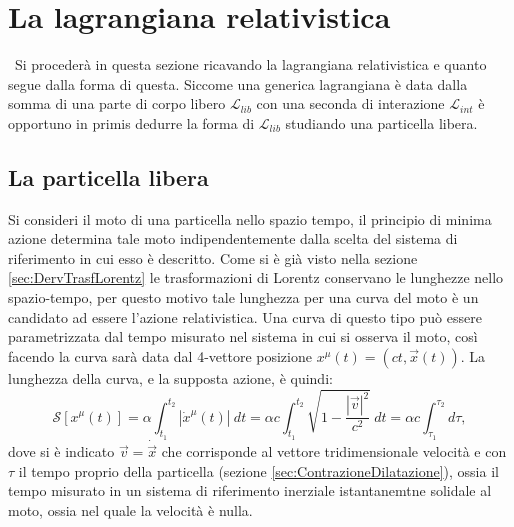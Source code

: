 \section{La lagrangiana relativistica}\
Si procederà in questa sezione ricavando la lagrangiana relativistica e quanto segue dalla forma di questa. Siccome una generica lagrangiana è data dalla somma di una parte di corpo libero $\mathcal{L}_{lib}$ con una seconda di interazione $\mathcal{L}_{int}$ è opportuno in primis dedurre la forma di $\mathcal{L}_{lib}$ studiando una particella libera.
\subsection{La particella libera}
Si consideri il moto di una particella nello spazio tempo, il principio di minima azione determina tale moto indipendentemente dalla scelta del sistema di riferimento in cui esso è descritto.
Come si è già visto nella sezione \ref{sec:DervTrasfLorentz} le trasformazioni di Lorentz conservano le lunghezze nello spazio-tempo, per questo motivo tale lunghezza per una curva del moto è un candidato ad essere l'azione relativistica. Una curva di questo tipo può essere parametrizzata dal tempo misurato nel sistema in cui si osserva il moto, così facendo la curva sarà data dal 4-vettore posizione $x^\mu(t)=(ct,\vec{x}(t))$. La lunghezza della curva, e la supposta azione, è quindi:
\begin{equation}
    \label{azioneRel}
    \mathcal{S}[x^\mu(t)]=\alpha\int_{t_1}^{t_2} |\dot{x}^\mu(t)|\ dt= \alpha c\int_{t_1}^{t_2} \sqrt{1-\frac{|\vec{v}|^2}{c^2}}\ dt=\alpha c\int_{\tau_1}^{\tau_2}d\tau,
\end{equation}
dove si è indicato $\vec{v}=\dot{\vec{x}}$ che corrisponde al vettore tridimensionale velocità e con $\tau$ il tempo proprio della particella (sezione \ref{sec:ContrazioneDilatazione}), ossia il tempo misurato in un sistema di riferimento inerziale istantanemtne solidale al moto, ossia nel quale la velocità è nulla.\\

